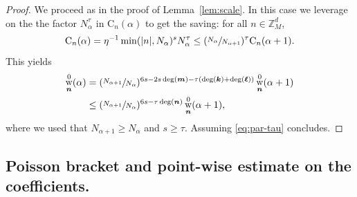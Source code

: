 \documentclass[10pt,a4paper]{amsart}
\DeclareMathOperator{\rw}{w}
\theoremstyle{plain}
\theoremstyle{definition}
\newcommand{\nb}{{\boldsymbol n}}
\newcommand{\kb}{{\boldsymbol k}}
\newcommand{\lb}{{\boldsymbol \ell}}
\newcommand{\mb}{{\boldsymbol m}}
\newcommand{\Z}{\mathbb{Z}}
\newcommand{\1}{\mathbf{1}}
\begin{document}
\begin{proof}
We proceed as in the proof of Lemma~\ref{lem:scale}. In this case we leverage on the the factor $N_{\alpha}^{\tau}$ in $\mathrm{C}_{n}(\alpha)$ to get the saving: for all $n\in\Z_{M}^{d}$,
\[
\mathrm{C}_{n}(\alpha) = \eta^{-1}\min(|n|, N_{\alpha})^{s}N_{\alpha}^{\tau} \leq (\sfrac{N_{\alpha}}{N_{\alpha+1}})^{\tau}\mathrm{C}_{n}(\alpha+1).
\]
This yields
\begin{align*}
\rw_{\nb}^{0}(\alpha)
&= (\sfrac{N_{\alpha+1}}{N_{\alpha}})^{6s - 2s\deg(\mb)-\tau(\deg(\kb)+\deg(\lb))} \rw_{\nb}^{0}(\alpha+1)\\
&\leq (\sfrac{N_{\alpha+1}}{N_{\alpha}})^{6s-\tau\deg(\nb)} \rw_{\nb}^{0}(\alpha+1),
\end{align*}
where we used that $N_{\alpha+1}\geq N_{\alpha}$ and $s\geq\tau$. Assuming \eqref{eq:par-tau} concludes.
\end{proof}

\subsection{Poisson bracket and point-wise estimate on the coefficients. }
\label{sec:poiss}
\end{document}
